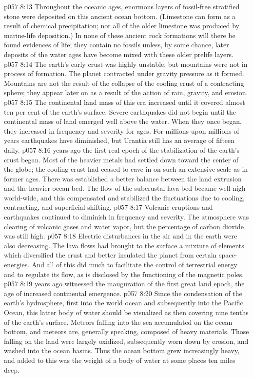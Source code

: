 \vs p057 8:13 Throughout the oceanic ages, enormous layers of fossil\hyp{}free stratified stone were deposited on this ancient ocean bottom. (Limestone can form as a result of chemical precipitation; not all of the older limestone was produced by marine\hyp{}life deposition.) In none of these ancient rock formations will there be found evidences of life; they contain no fossils unless, by some chance, later deposits of the water ages have become mixed with these older prelife layers.
\vs p057 8:14 The earth’s early crust was highly unstable, but mountains were not in process of formation. The planet contracted under gravity pressure as it formed. Mountains are not the result of the collapse of the cooling crust of a contracting sphere; they appear later on as a result of the action of rain, gravity, and erosion.
\vs p057 8:15 The continental land mass of this era increased until it covered almost ten per cent of the earth’s surface. Severe earthquakes did not begin until the continental mass of land emerged well above the water. When they once began, they increased in frequency and severity for ages. For millions upon millions of years earthquakes have diminished, but Urantia still has an average of fifteen daily.
\pc \vs p057 8:16  years ago the first real epoch of the stabilization of the earth’s crust began. Most of the heavier metals had settled down toward the center of the globe; the cooling crust had ceased to cave in on such an extensive scale as in former ages. There was established a better balance between the land extrusion and the heavier ocean bed. The flow of the subcrustal lava bed became well\hyp{}nigh world\hyp{}wide, and this compensated and stabilized the fluctuations due to cooling, contracting, and superficial shifting.
\vs p057 8:17 Volcanic eruptions and earthquakes continued to diminish in frequency and severity. The atmosphere was clearing of volcanic gases and water vapor, but the percentage of carbon dioxide was still high.
\vs p057 8:18 Electric disturbances in the air and in the earth were also decreasing. The lava flows had brought to the surface a mixture of elements which diversified the crust and better insulated the planet from certain space\hyp{}energies. And all of this did much to facilitate the control of terrestrial energy and to regulate its flow, as is disclosed by the functioning of the magnetic poles.
\pc \vs p057 8:19  years ago witnessed the inauguration of the first great land epoch, the age of increased continental emergence.
\vs p057 8:20 Since the condensation of the earth’s hydrosphere, first into the world ocean and subsequently into the Pacific Ocean, this latter body of water should be visualized as then covering nine tenths of the earth’s surface. Meteors falling into the sea accumulated on the ocean bottom, and meteors are, generally speaking, composed of heavy materials. Those falling on the land were largely oxidized, subsequently worn down by erosion, and washed into the ocean basins. Thus the ocean bottom grew increasingly heavy, and added to this was the weight of a body of water at some places ten miles deep.
